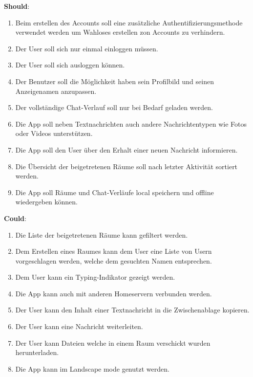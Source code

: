     \textbf{Should}:
    \begin{enumerate}[label={\roman*.}, leftmargin=2.5cm]
        \item Beim erstellen des Accounts soll eine zusätzliche Authentifizierungsmethode verwendet werden um Wahloses erstellen zon Accounts zu verhindern.
        \item Der User soll sich nur einmal einloggen müssen.
        \item Der User soll sich ausloggen können.
        \item Der Benutzer soll die Möglichkeit haben sein Profilbild und seinen Anzeigenamen anzupassen.
        \item Der vollständige Chat-Verlauf soll nur bei Bedarf geladen werden.
        \item Die App soll neben Textnachrichten auch andere Nachrichtentypen wie Fotos oder Videos unterstützen.
        \item Die App soll den User über den Erhalt einer neuen Nachricht informieren.
        \item Die Übersicht der beigetretenen Räume soll nach letzter Aktivität sortiert werden.
        \item Die App soll Räume und Chat-Verläufe local speichern und offline wiedergeben können.
    \end{enumerate}


    \textbf{Could}:
    \begin{enumerate}[label={\roman*.}, leftmargin=2.5cm]
        \item Die Liste der beigetretenen Räume kann gefiltert werden.
        \item Dem Erstellen eines Raumes kann dem User eine Liste von Usern vorgeschlagen werden, welche dem gesuchten Namen entsprechen.
        \item Dem User kann ein Typing-Indikator gezeigt werden.
        \item Die App kann auch mit anderen Homeservern verbunden werden.
        \item Der User kann den Inhalt einer Textnachricht in die Zwischenablage kopieren.
        \item Der User kann eine Nachricht weiterleiten.
        \item Der User kann Dateien welche in einem Raum verschickt wurden herunterladen.
        \item Die App kann im Landscape mode genutzt werden.
    \end{enumerate}


